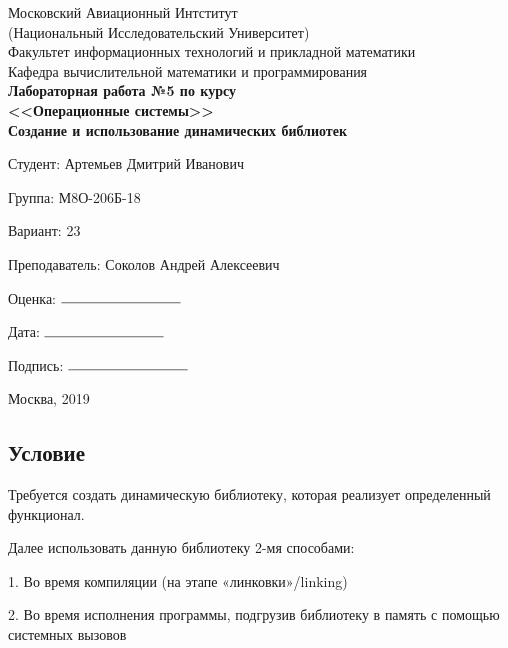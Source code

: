 \documentclass[12pt]{article}
\begin{document}
\begin{titlepage}
  \large
  \begin{center} 
    
      Московский Авиационный Интститут \\
      (Национальный Исследовательский Университет) \\
      Факультет информационных технологий и прикладной математики \\
      Кафедра вычислительной математики и программирования \\
      \vfill\vfill
      \textbf{
        { Лабораторная работа №5 по курсу} \\ 
        <<Операционные системы>> \\
        \bigskip
            {Создание и использование динамических библиотек } \\
    } 
  \end{center}
  \vfill

  \begin{flushright}

    Студент:  {Артемьев Дмитрий Иванович}

    Группа: {М8О-206Б-18}

    Вариант: {23}
    
    Преподаватель: {Соколов Андрей Алексеевич}

    Оценка: $\rule{3cm}{0.15mm}$

    Дата: $\rule{3cm}{0.15mm}$
    
    Подпись: $\rule{3cm}{0.15mm}$

  \end{flushright}
  \vfill
  \begin{center}
    Москва, 2019
  \end{center}
  
\end{titlepage}

\subsection*{Условие}

Требуется создать динамическую библиотеку, которая реализует определенный функционал.

Далее использовать данную библиотеку 2-мя способами:

1. Во время компиляции (на этапе «линковки»/linking)

2. Во время исполнения программы, подгрузив библиотеку в память с помощью системных
вызовов
\end{document}
